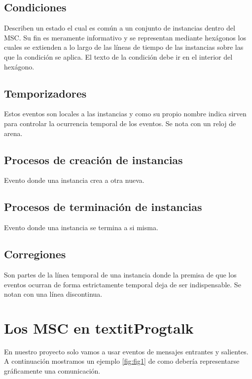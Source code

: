 \subsection*{Condiciones}
Describen un estado el cual es común a un conjunto de instancias
dentro del MSC. Su fin es meramente informativo y se representan
mediante hexágonos los cuales se extienden a lo largo de las líneas de
tiempo de las instancias sobre las que la condición se aplica. El
texto de la condición debe ir en el interior del hexágono.
\subsection*{Temporizadores}
Estos eventos son locales a las instancias y como su propio nombre
indica sirven para controlar la ocurrencia temporal de los eventos. Se
nota con un reloj de arena.
\subsection*{Procesos de creación de instancias} 
Evento donde una instancia crea a otra nueva.
\subsection*{Procesos de terminación de instancias}
Evento donde una instancia se termina a si misma.
\subsection*{Corregiones}
Son partes de la línea temporal de una instancia donde la premisa de
que los eventos ocurran de forma estrictamente temporal deja de ser
indispensable. Se notan con una línea discontinua.

\section{Los MSC en textit{Progtalk}}
En nuestro proyecto solo vamos a usar eventos de mensajes entrantes y
salientes. A continuación mostramos un ejemplo \ref{fig:fig1} de como
debería representarse gráficamente una comunicación.


